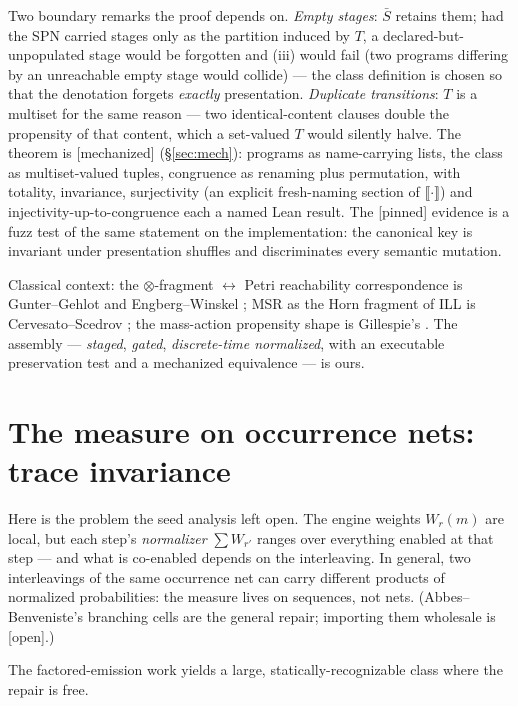 \documentclass[11pt]{article}
\newcommand{\tensor}{\otimes}
\newcommand{\sem}[1]{\llbracket #1 \rrbracket}
\newcommand{\stmech}{[\textsf{mechanized}]}
\newcommand{\stpinned}{[\textsf{pinned}]}
\newcommand{\stopen}{[\textsf{open}]}
\theoremstyle{plain}
\theoremstyle{definition}
\theoremstyle{remark}
\begin{document}
Two boundary remarks the proof depends on. \emph{Empty stages}: $\bar S$
retains them; had the SPN carried stages only as the partition induced
by $T$, a declared-but-unpopulated stage would be forgotten and (iii)
would fail (two programs differing by an unreachable empty stage would
collide) --- the class definition is chosen so that the denotation
forgets \emph{exactly} presentation. \emph{Duplicate transitions}: $T$
is a multiset for the same reason --- two identical-content clauses
double the propensity of that content, which a set-valued $T$ would
silently halve. The theorem is \stmech{} (\S\ref{sec:mech}): programs as
name-carrying lists, the class as multiset-valued tuples, congruence as
renaming plus permutation, with totality, invariance, surjectivity (an
explicit fresh-naming section of $\sem{\cdot}$) and
injectivity-up-to-congruence each a named Lean result. The \stpinned{}
evidence is a fuzz test of the same statement on the implementation:
the canonical key is invariant under presentation shuffles and
discriminates every semantic mutation.

Classical context: the $\tensor$-fragment $\leftrightarrow$ Petri
reachability correspondence is Gunter--Gehlot \cite{GG89} and
Engberg--Winskel \cite{EW93}; MSR as the Horn fragment of ILL is
Cervesato--Scedrov \cite{CS09}; the mass-action propensity shape is
Gillespie's \cite{Gil77}. The assembly --- \emph{staged}, \emph{gated},
\emph{discrete-time normalized}, with an executable preservation test
and a mechanized equivalence --- is ours.

\section{The measure on occurrence nets: trace invariance}
\label{sec:trace}

Here is the problem the seed analysis left open. The engine weights
$W_r(m)$ are local, but each step's \emph{normalizer} $\sum W_{r'}$
ranges over everything enabled at that step --- and what is co-enabled
depends on the interleaving. In general, two interleavings of the same
occurrence net can carry different products of normalized
probabilities: the measure lives on sequences, not nets.
(Abbes--Benveniste's branching cells \cite{AB06} are the general
repair; importing them wholesale is \stopen{}.)

The factored-emission work yields a large, statically-recognizable
class where the repair is free.
\end{document}
